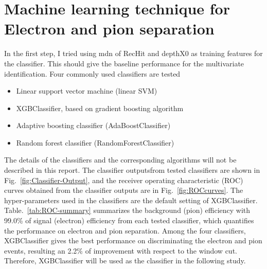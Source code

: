 \section{Machine learning technique for Electron and pion separation}
\label{sec:ElectronID-BDT}
In the first step, I tried using mdn of RecHit and depthX0 as training features for the classifier. This should give the baseline performance for the multivariate identification. Four commonly used classifiers are tested 
\begin{itemize}  
\item Linear support vector machine (linear SVM)
\item XGBClassifier, based on gradient boosting algorithm
\item Adaptive boosting classifier (AdaBoostClassifier)
\item Random forest classifier (RandomForestClassifier)
\end{itemize}
The details of the classifiers and the corresponding algorithms will not be described in this report. 
The classifier outputs\footnotemark from tested classifiers are shown in Fig.~\ref{fig:Classifier-Output}, and the receiver operating characteristic (ROC) curves obtained from the classifier outputs are in Fig.~\ref{fig:ROCcurves}.
The hyper-parameters used in the classifiers are the default setting of XGBClassifier. Table.~\ref{tab:ROC-summary} summarizes the background (pion) efficiency with 99.0\% of signal (electron) efficiency from each tested classifier, which quantifies the performance on electron and pion separation. Among the four classifiers, XGBClassifier gives the best performance on discriminating the electron and pion events, resulting an 2.2\% of improvement with respect to the window cut. 
Therefore, XGBClassifier will be used as the classifier in the following study.
\clearpage



